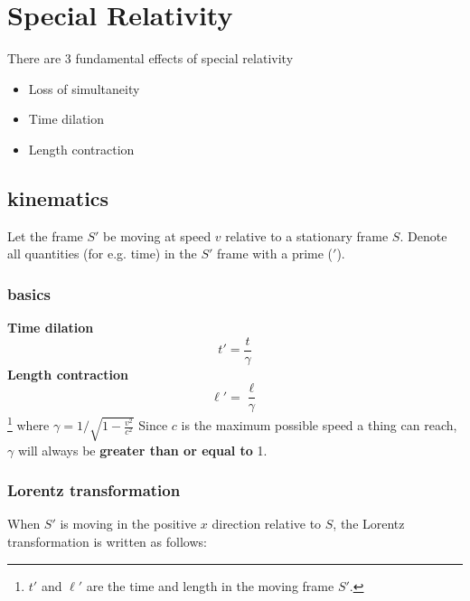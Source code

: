 \chapter{Special Relativity}
There are 3 fundamental effects of special relativity
\begin{itemize}
    \item Loss of simultaneity
    \item Time dilation
    \item Length contraction
\end{itemize}
\section{kinematics}
Let the frame $S'$ be moving at speed $v$ relative to a stationary frame $S$. Denote all quantities (for e.g. time) in the $S'$ frame with a prime ($'$).  
\subsection{basics}
\textbf{Time dilation}
\begin{equation}
    t'=\frac{t}{\gamma}
\end{equation}
\textbf{Length contraction}
\begin{equation}
    \ell'=\frac{\ell}{\gamma}
\end{equation} \footnote{$t'$ and $\ell'$ are the time and length in the moving frame $S'$.}
where $\gamma=1/\sqrt{1-\frac{v^2}{c^2}}$
Since $c$ is the maximum possible speed a thing can reach, $\gamma$ will always be \textbf{greater than or equal to} 1. 
\subsection{Lorentz transformation}
When $S'$ is moving in the positive $x$ direction relative to $S$, the Lorentz transformation is written as follows: 


